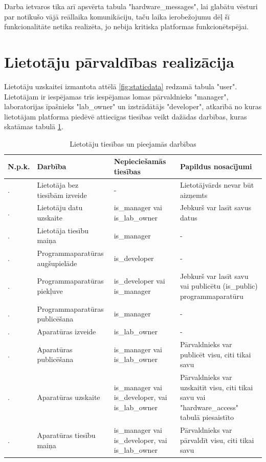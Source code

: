 Darba ietvaros tika arī apsvērta tabula "hardware\_messages", lai glabātu vēsturi
par notikušo vājā reāllaika komunikāciju, taču laika ierobežojumu dēļ šī
funkcionalitāte netika realizēta, jo nebija kritiska platformas
funkcionētspējai.

\section{Lietotāju pārvaldības realizācija}
\label{sec:usermgmt}

Lietotāju uzskaitei izmantota attēlā \ref{fig:staticdata} redzamā tabula "user".
Lietotājam ir iespējamas trīs iespējamas lomas pārvaldnieks "manager",
laboratorijas īpašnieks "lab\_owner" un izstrādātājs "developer", atkarībā no
kuras lietotājam platforma piedēvē attiecīgas tiesības veikt dažādas darbības,
kuras skatāmas tabulā \ref{table:permissions}.

\begin{table}[H]
    \newcommand\rownumber{\stepcounter{permissioncounter}\arabic{permissioncounter}.}
    \begin{tabular}{ |p{1cm}|p{5cm}|p{3cm}|p{6cm}| }
    \hline
    N.p.k.&Darbība&Nepieciešamās tiesības&Papildus nosacījumi \\
    \hline
    \rownumber & Lietotāja bez tiesībām izveide & - & Lietotājvārds nevar būt aizņemts \\
    \hline
    \rownumber & Lietotāju datu uzskaite & is\_manager vai is\_lab\_owner & Jebkurš var lasīt savus datus \\
    \hline
    \rownumber & Lietotāja tiesību maiņa & is\_manager & - \\
    \hline
    \rownumber & Programmaparatūras augšupielāde & is\_developer & - \\
    \hline
    \rownumber & Programmaparatūras piekļuve & is\_developer vai is\_manager & Jebkurš var lasīt savu vai publicētu (is\_public) programmaparatūru \\
    \hline
    \rownumber & Programmaparatūras publicēšana & is\_manager & - \\
    \hline
    \rownumber & Aparatūras izveide & is\_lab\_owner & - \\
    \hline
    \rownumber & Aparatūras publicēšana & is\_manager vai is\_lab\_owner &
        Pārvaldnieks var publicēt visu, citi tikai savu \\
    \hline
    \rownumber & Aparatūras uzskaite & is\_manager vai is\_developer, vai
        is\_lab\_owner & Pārvaldnieks var uzskaitīt visu, citi tikai savu vai
        "hardware\_access" tabulā piesaistīto \\
    \hline
    \rownumber & Aparatūras tiesību maiņa & is\_manager vai is\_developer, vai
        is\_lab\_owner & Pārvaldnieks var pārvaldīt visu, citi tikai savu \\
    \hline
    \end{tabular}
    \centering
    \captionsetup{justification=centering}
    \caption{Lietotāju tiesības un pieejamās darbības}
    \label{table:permissions}
\end{table}

